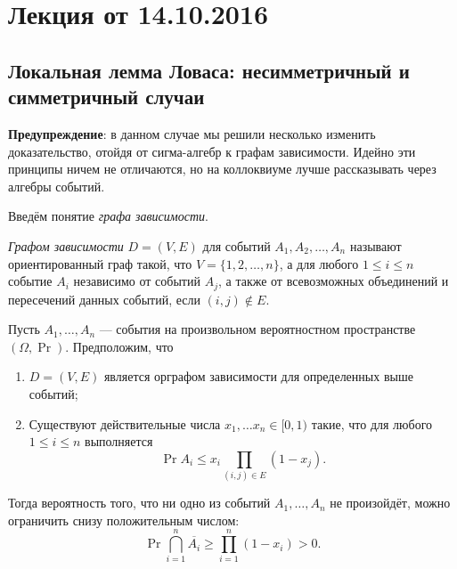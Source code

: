 \section{Лекция от 14.10.2016}

\subsection{Локальная лемма Ловаса: несимметричный и симметричный случаи}
\textbf{Предупреждение}: в данном случае мы решили несколько изменить доказательство, отойдя от сигма-алгебр к графам зависимости. Идейно эти принципы ничем не отличаются, но на коллоквиуме лучше рассказывать через алгебры событий.

Введём понятие \emph{графа зависимости}.

\begin{definition}
    \emph{Графом зависимости} \(D = (V, E)\) для событий \(A_1, A_2, \dots, A_n\) называют ориентированный граф такой, что \(V = \{1, 2, \dots, n\}\), а для любого \(1 \leq i \leq n\) событие \(A_i\) независимо от событий \(A_j\), а также от всевозможных объединений и пересечений данных событий, если \((i, j) \notin E\). 
\end{definition}

\begin{theorem}
    Пусть \(A_1, \dots, A_n\) --- события на произвольном вероятностном пространстве \((\Omega, \Pr)\). Предположим, что
    \begin{enumerate}
        \item \(D = (V, E) \) является орграфом зависимости для определенных выше событий;
        \item Существуют действительные числа \(x_1, \ldots x_n \in [0, 1) \) такие, 
        что для любого \(1 \leq i \leq n\) выполняется \[\Pr{A_i} \leq x_i \prod\limits_{(i, j) \in E} (1 - x_j).\]
    \end{enumerate}
    
    Тогда вероятность того, что ни одно из событий \(A_1, \dots, A_n\) не произойдёт, можно ограничить снизу положительным числом: \[\Pr{\bigcap\limits_{i = 1}^{n}\overline{A_i}} \geq \prod\limits_{i = 1}^{n}(1 - x_i) > 0.\]
\end{theorem}

